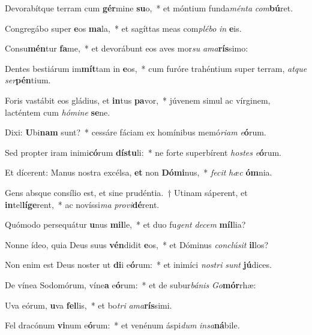 \item Devorabítque terram cum \textbf{gér}mine \textbf{su}o,~* et móntium funda\textit{mén}\textit{ta} \textit{com}\textbf{bú}ret.
\item Congregábo super \textbf{e}os \textbf{ma}la,~* et sagíttas meas com\textit{plé}\textit{bo} \textit{in} \textbf{e}is.
\item Consu\textbf{mén}tur \textbf{fa}me,~* et devorábunt eos aves mor\textit{su} \textit{a}\textit{ma}\textbf{rís}simo:
\item Dentes bestiárum im\textbf{mít}tam in \textbf{e}os,~* cum furóre trahéntium super terram, \textit{at}\textit{que} \textit{ser}\textbf{pén}tium.
\item Foris vastábit eos gládius, et \textbf{in}tus \textbf{pa}vor,~* júvenem simul ac vírginem, lacténtem cum \textit{hó}\textit{mi}\textit{ne} \textbf{se}ne.
\item Dixi: \textbf{U}bi\textbf{nam} sunt?~* cessáre fáciam ex homínibus memó\textit{ri}\textit{am} \textit{e}\textbf{ó}rum.
\item Sed propter iram inimi\textbf{có}rum \textbf{dís}\textbf{tu}li:~* ne forte superbírent \textit{hos}\textit{tes} \textit{e}\textbf{ó}rum.
\item Et dícerent: Manus nostra excélsa, \textbf{et} non \textbf{Dó}\textbf{mi}nus,~* \textit{fe}\textit{cit} \textit{hæc} \textbf{óm}nia.
\item Gens absque consílio est, et sine prudéntia.~† Utinam sáperent, et \textbf{in}tel\textbf{lí}\textbf{ge}rent,~* ac novíssi\textit{ma} \textit{pro}\textit{vi}\textbf{dé}rent.
\item Quómodo persequátur \textbf{u}nus \textbf{mil}le,~* et duo fu\textit{gent} \textit{de}\textit{cem} \textbf{míl}lia?
\item Nonne ídeo, quia Deus suus \textbf{vén}didit \textbf{e}os,~* et Dóminus \textit{con}\textit{clú}\textit{sit} \textbf{il}los?
\item Non enim est Deus noster ut \textbf{di}i e\textbf{ó}rum:~* et inimíci \textit{nos}\textit{tri} \textit{sunt} \textbf{jú}dices.
\item De vínea Sodomórum, víne\textbf{a} e\textbf{ó}rum:~* et de subur\textit{bá}\textit{nis} \textit{Go}\textbf{mór}rhæ:
\item Uva eórum, \textbf{u}va \textbf{fel}lis,~* et bo\textit{tri} \textit{a}\textit{ma}\textbf{rís}simi.
\item Fel dracónum \textbf{vi}num e\textbf{ó}rum:~* et venénum áspi\textit{dum} \textit{in}\textit{sa}\textbf{ná}bile.
